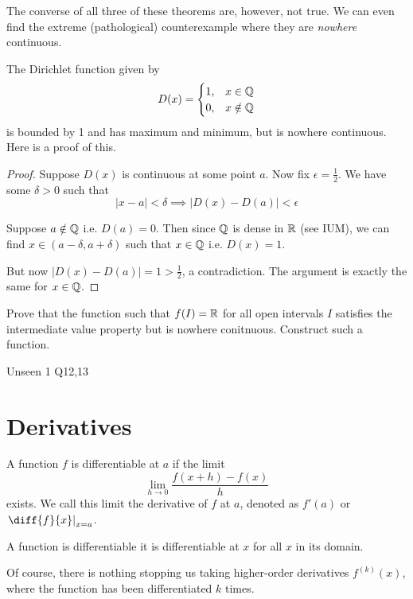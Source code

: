 \documentclass[11pt]{article}
\begin{document}
The converse of all three of these theorems are, however, not true. We can even find the extreme (pathological) counterexample where they are \emph{nowhere} continuous.
\begin{example}
  The Dirichlet function given by
  \[D(x)=\begin{cases}
    1,& x\in\mathbb{Q}\\   
    0,& x\notin\mathbb{Q}
  \end{cases}\]
  is bounded by 1 and has maximum and minimum, but is nowhere continuous. Here is a proof of this.

  \begin{proof}
    Suppose \(D(x)\) is continuous at some point \(a\). Now fix \(\epsilon=\frac{1}{2}\). We have some \(\delta>0\) such that
    \[|x-a|<\delta\implies |D(x)-D(a)|<\epsilon\]

    Suppose \(a\notin\mathbb{Q}\) i.e. \(D(a)=0\). Then since \(\mathbb{Q}\) is dense in \(\mathbb{R}\) (see IUM), we can find \(x\in(a-\delta,a+\delta)\) such that \(x\in\mathbb{Q}\) i.e. \(D(x)=1\). 
    
    But now \(|D(x)-D(a)|=1>\frac{1}{2}\), a contradiction. The argument is exactly the same for \(x\in\mathbb{Q}\).

  \end{proof} 
\end{example}
\begin{problem}
  Prove that the function such that \(f(I)=\mathbb{R}\) for all open intervals \(I\) satisfies the intermediate value property but is nowhere conitnuous. Construct such a function.
\end{problem}
\begin{solution}
  Unseen 1 Q12,13
\end{solution}

\section{Derivatives}
\begin{definition}[Differentiability]
  A function \(f\) is differentiable at \(a\) if the limit
  \[\lim_{h\to 0}\frac{f(x+h)-f(x)}{h}\]
  exists. We call this limit the derivative of \(f\) at \(a\), denoted as \(f'(a)\) or \(\left.\diff{f}{x}\right\rvert_{x=a}\).

  A function is differentiable it is differentiable at \(x\) for all \(x\) in its domain.
\end{definition}
Of course, there is nothing stopping us taking higher-order derivatives \(f^(k)(x)\), where the function has been differentiated \(k\) times.
\end{document}
